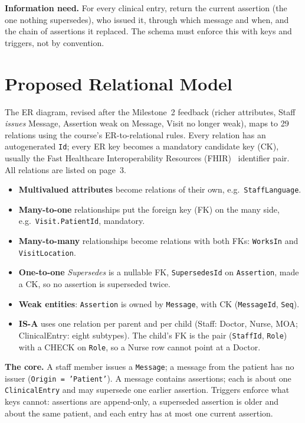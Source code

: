 \documentclass[sigconf]{acmart}
\begin{document}
\textbf{Information need.} For every clinical entry, return the current assertion (the one nothing supersedes), who issued it, through which message and when, and the chain of assertions it replaced. The schema must enforce this with keys and triggers, not by convention.

\section{Proposed Relational Model}\label{sec:model}
The ER diagram, revised after the Milestone~2 feedback (richer attributes, Staff \emph{issues} Message, Assertion weak on Message, Visit no longer weak), maps to 29 relations using the course's ER-to-relational rules. Every relation has an autogenerated \texttt{Id}; every ER key becomes a mandatory candidate key (CK), usually the Fast Healthcare Interoperability Resources (FHIR)~\cite{fhir-r4} identifier pair. All relations are listed on page~3.
{\sloppy\setlength{\leftmargini}{1em}\begin{itemize}\setlength{\itemsep}{0pt}
\item \textbf{Multivalued attributes} become relations of their own, e.g.\ \texttt{StaffLanguage}.
\item \textbf{Many-to-one} relationships put the foreign key (FK) on the many side, e.g.\ \texttt{Visit.PatientId}, mandatory.
\item \textbf{Many-to-many} relationships become relations with both FKs: \texttt{WorksIn} and \texttt{VisitLocation}.
\item \textbf{One-to-one} \emph{Supersedes} is a nullable FK, \texttt{SupersedesId} on \texttt{Assertion}, made a CK, so no assertion is superseded twice.
\item \textbf{Weak entities}: \texttt{Assertion} is owned by \texttt{Message}, with CK (\texttt{MessageId}, \texttt{Seq}).
\item \textbf{IS-A} uses one relation per parent and per child (Staff: Doctor, Nurse, MOA; ClinicalEntry: eight subtypes). The child's FK is the pair (\texttt{StaffId}, \texttt{Role}) with a CHECK on \texttt{Role}, so a Nurse row cannot point at a Doctor.
\end{itemize}}
\textbf{The core.} A staff member issues a \texttt{Message}; a message from the patient has no issuer (\texttt{Origin = 'Patient'}). A message contains assertions; each is about one \texttt{ClinicalEntry} and may supersede one earlier assertion. Triggers enforce what keys cannot: assertions are append-only, a superseded assertion is older and about the same patient, and each entry has at most one current assertion.
\end{document}
